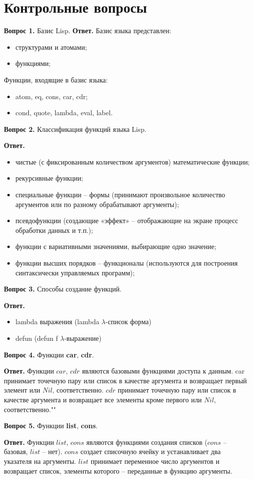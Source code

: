 \section*{Контрольные вопросы}

\textbf{Вопрос 1.} Базис Lisp. \newline
\indent\textbf{Ответ. }
Базис языка представлен:
\begin{itemize}
	\item структурами и атомами;
	\item функциями;
\end{itemize}

Функции, входящие в базис языка:
\begin{itemize}
	\item atom, eq, cons, car, cdr;
	\item cond, quote, lambda, eval, label.
\end{itemize}


\textbf{Вопрос 2.} Классификация функций языка Lisp.

\textbf{Ответ.} 

\begin{itemize}
	\item чистые (с фиксированным количеством аргументов) математические функции;
	\item рекурсивные функции;
	\item специальные функции – формы (принимают произвольное количество аргументов или по разному обрабатывают аргументы);
	\item псевдофункции (создающие «эффект» – отображающие на экране процесс обработки данных и т.п.);
	\item функции с вариативными значениями, выбирающие одно значение;
	\item функции высших порядков – функционалы (используются для построения синтаксически управляемых программ);
\end{itemize}

\textbf{Вопрос 3.} Способы создание функций.

\textbf{Ответ.}
\begin{itemize}
	\item lambda выражения (lambda $\lambda$-список форма)
	\item defun (defun f $\lambda$-выражение)
\end{itemize}


\textbf{Вопрос 4.} Функции \textbf{car}, \textbf{cdr}.

\textbf{Ответ.} Функции $car$, $cdr$ являются базовыми функциями доступа к
данным. car принимает точечную пару или список в качестве аргумента
и возвращает первый элемент или $Nil$, соответственно. $cdr$ принимает точечную пару или список в качестве аргумента и возвращает все элементы
кроме первого или $Nil$, соответственно.""\newline

\textbf{Вопрос 5.} Функции \textbf{list}, \textbf{cons}.

\textbf{Ответ.} Функции $list$, $cons$ являются функциями создания списков
($cons$ – базовая, $list$ – нет). $cons$ создает списочную ячейку и устанавливает два указателя на аргументы. $list$ принимает переменное число аргументов и возвращает список, элементы которого – переданные в функцию
аргументы.